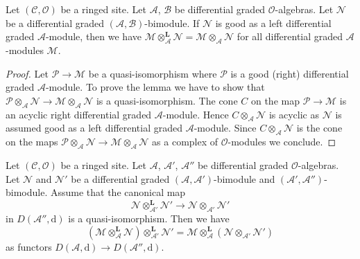 \begin{lemma}
\label{lemma-good-on-other-side}
Let $(\mathcal{C}, \mathcal{O})$ be a ringed site. Let
$\mathcal{A}$, $\mathcal{B}$ be differential graded $\mathcal{O}$-algebras.
Let $\mathcal{N}$ be a  differential graded
$(\mathcal{A}, \mathcal{B})$-bimodule. If $\mathcal{N}$ is good
as a left differential graded $\mathcal{A}$-module, then
we have $\mathcal{M} \otimes_\mathcal{A}^\mathbf{L} \mathcal{N} =
\mathcal{M} \otimes_\mathcal{A} \mathcal{N}$ for all
differential graded $\mathcal{A}$-modules $\mathcal{M}$.
\end{lemma}

\begin{proof}
Let $\mathcal{P} \to \mathcal{M}$ be a quasi-isomorphism where
$\mathcal{P}$ is a good (right) differential graded $\mathcal{A}$-module.
To prove the lemma we have to show that
$\mathcal{P} \otimes_\mathcal{A} \mathcal{N} \to
\mathcal{M} \otimes_\mathcal{A} \mathcal{N}$
is a quasi-isomorphism. The cone $C$ on the map
$\mathcal{P} \to \mathcal{M}$ is an acyclic right differential
graded $\mathcal{A}$-module. Hence
$C \otimes_\mathcal{A} \mathcal{N}$ is acyclic as $\mathcal{N}$
is assumed good as a left differential graded $\mathcal{A}$-module.
Since $C \otimes_\mathcal{A} \mathcal{N}$ is the cone on the
maps $\mathcal{P} \otimes_\mathcal{A} \mathcal{N} \to
\mathcal{M} \otimes_\mathcal{A} \mathcal{N}$ as a complex
of $\mathcal{O}$-modules we conclude.
\end{proof}

\begin{lemma}
\label{lemma-compose-tensor}
Let $(\mathcal{C}, \mathcal{O})$ be a ringed site. Let
$\mathcal{A}$, $\mathcal{A}'$, $\mathcal{A}''$ be differential graded
$\mathcal{O}$-algebras. Let $\mathcal{N}$ and $\mathcal{N}'$ be a
differential graded $(\mathcal{A}, \mathcal{A}')$-bimodule
and $(\mathcal{A}', \mathcal{A}'')$-bimodule. Assume
that the canonical map
$$
\mathcal{N} \otimes_{\mathcal{A}'}^\mathbf{L} \mathcal{N}'
\longrightarrow
\mathcal{N} \otimes_{\mathcal{A}'} \mathcal{N}'
$$
in $D(\mathcal{A}'', \text{d})$ is a quasi-isomorphism.
Then we have
$$
(\mathcal{M}
\otimes_\mathcal{A}^\mathbf{L} \mathcal{N})
\otimes_{\mathcal{A}'}^\mathbf{L} \mathcal{N}'
=
\mathcal{M}
\otimes_\mathcal{A}^\mathbf{L}
(\mathcal{N} \otimes_{\mathcal{A}'} \mathcal{N}')
$$
as functors $D(\mathcal{A}, \text{d}) \to D(\mathcal{A}'', \text{d})$.
\end{lemma}

